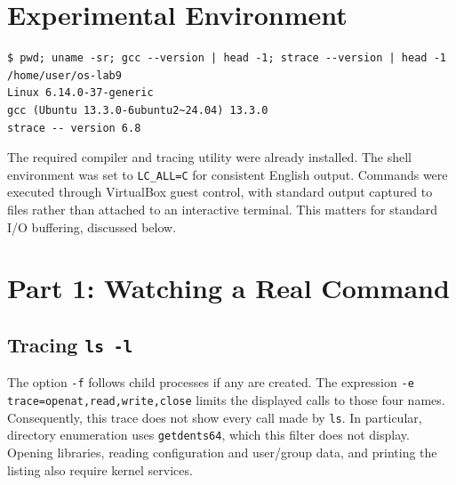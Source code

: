 \documentclass[12pt,a4paper]{article}
\begin{document}
\section{Experimental Environment}

\begin{lstlisting}[caption={Working directory, kernel, compiler, and tracing tool}]
$ pwd; uname -sr; gcc --version | head -1; strace --version | head -1
/home/user/os-lab9
Linux 6.14.0-37-generic
gcc (Ubuntu 13.3.0-6ubuntu2~24.04) 13.3.0
strace -- version 6.8
\end{lstlisting}

The required compiler and tracing utility were already installed. The shell
environment was set to \texttt{LC\_ALL=C} for consistent English output.
Commands were executed through VirtualBox guest control, with standard output
captured to files rather than attached to an interactive terminal. This matters
for standard I/O buffering, discussed below.

\section{Part 1: Watching a Real Command}
\subsection{Tracing \texttt{ls -l}}
The option \texttt{-f} follows child processes if any are created. The expression
\texttt{-e trace=openat,read,write,close} limits the displayed calls to those four
names. Consequently, this trace does not show every call made by \texttt{ls}.
In particular, directory enumeration uses \texttt{getdents64}, which this filter
does not display. Opening libraries, reading configuration and user/group data,
and printing the listing also require kernel services.
\end{document}
